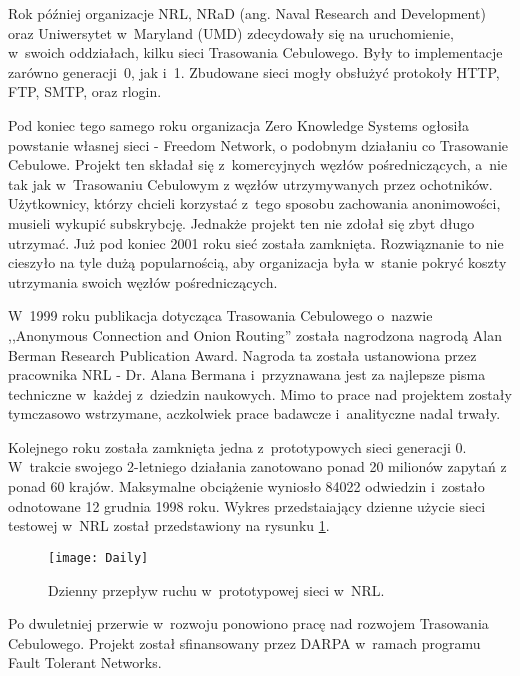 Rok później organizacje NRL,  NRaD (ang. Naval Research and Development) oraz Uniwersytet w~Maryland (UMD) zdecydowały się na uruchomienie, w~swoich oddziałach, kilku sieci Trasowania Cebulowego. Były to implementacje zarówno generacji~0, jak i~1. Zbudowane sieci mogły obsłużyć protokoły HTTP, FTP, SMTP, oraz rlogin\cite{onion_router_history, cybercrime}. 

Pod koniec tego samego roku organizacja Zero Knowledge Systems ogłosiła powstanie własnej sieci - Freedom Network, o podobnym działaniu co Trasowanie Cebulowe. Projekt ten składał się z~komercyjnych węzłów pośredniczących, a~nie tak jak w~Trasowaniu Cebulowym z węzłów utrzymywanych przez ochotników. Użytkownicy, którzy chcieli korzystać z~tego sposobu zachowania anonimowości, musieli wykupić subskrybcję. Jednakże projekt ten nie zdołał się zbyt długo utrzymać. Już pod koniec 2001 roku sieć została zamknięta. Rozwiąznanie to nie cieszyło na tyle dużą popularnością, aby organizacja była w~stanie pokryć koszty utrzymania swoich węzłów pośredniczących.

W~1999 roku publikacja dotycząca Trasowania Cebulowego o~nazwie ,,Anonymous Connection and Onion Routing'' została nagrodzona nagrodą Alan Berman Research Publication Award. Nagroda ta została ustanowiona przez pracownika NRL - Dr. Alana Bermana i~przyznawana jest za najlepsze pisma techniczne w~każdej z~dziedzin naukowych\cite{berman_award}. Mimo to prace nad projektem zostały tymczasowo wstrzymane, aczkolwiek prace badawcze i~analityczne nadal trwały.

Kolejnego roku została zamknięta jedna z~prototypowych sieci generacji 0. W~trakcie swojego 2-letniego działania zanotowano ponad 20 milionów zapytań z ponad 60 krajów. Maksymalne obciążenie wyniosło 84022 odwiedzin i~zostało odnotowane 12 grudnia 1998 roku. Wykres przedstaiający dzienne użycie sieci testowej w~NRL został przedstawiony na rysunku \ref{rys:dzienny}.

\begin{figure}
  \centering
  \texttt{[image: Daily]} 
  \caption[Caption for LOF]{Dzienny przepływ ruchu w~prototypowej sieci w~NRL\footnotemark.}
  \label{rys:dzienny}
\end{figure}

Po dwuletniej przerwie w~rozwoju ponowiono pracę nad rozwojem Trasowania Cebulowego. Projekt został sfinansowany przez DARPA w~ramach programu Fault Tolerant Networks.

